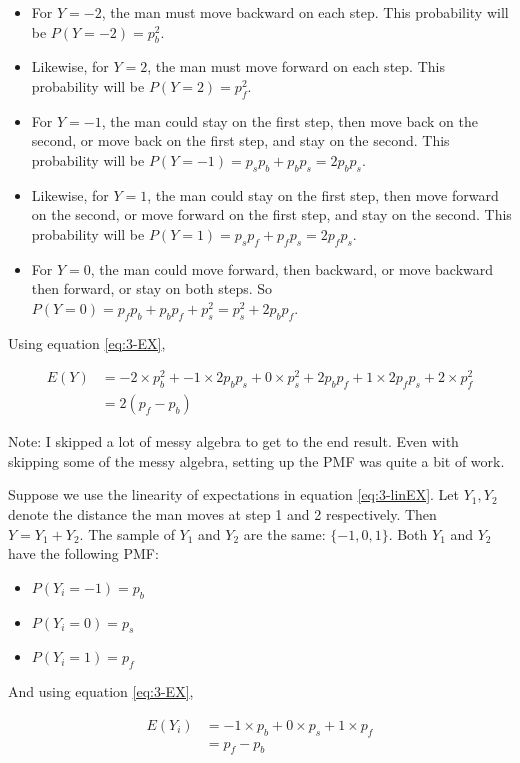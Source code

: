 \documentclass[
]{book}
\providecommand{\tightlist}{%
  \setlength{\itemsep}{0pt}\setlength{\parskip}{0pt}}
\begin{document}
\begin{itemize}
\tightlist
\item
  For \(Y=-2\), the man must move backward on each step. This probability will be \(P(Y=-2) = p_b^2\).
\item
  Likewise, for \(Y=2\), the man must move forward on each step. This probability will be \(P(Y=2) = p_f^2\).
\item
  For \(Y=-1\), the man could stay on the first step, then move back on the second, or move back on the first step, and stay on the second. This probability will be \(P(Y=-1) = p_s p_b + p_b p_s = 2p_b p_s\).
\item
  Likewise, for \(Y=1\), the man could stay on the first step, then move forward on the second, or move forward on the first step, and stay on the second. This probability will be \(P(Y=1) = p_s p_f + p_f p_s = 2p_f p_s\).
\item
  For \(Y=0\), the man could move forward, then backward, or move backward then forward, or stay on both steps. So \(P(Y=0) = p_f p_b + p_b p_f + p_s^2 = p_s^2 + 2 p_b p_f\).
\end{itemize}

Using equation \eqref{eq:3-EX},

\[
\begin{split}
E(Y) &= -2 \times p_b^2 + -1 \times 2p_b p_s + 0 \times p_s^2 + 2 p_b p_f + 1 \times 2p_f p_s + 2 \times p_f^2 \\
       &= 2 (p_f - p_b)
\end{split}
\]

Note: I skipped a lot of messy algebra to get to the end result. Even with skipping some of the messy algebra, setting up the PMF was quite a bit of work.

Suppose we use the linearity of expectations in equation \eqref{eq:3-linEX}. Let \(Y_1, Y_2\) denote the distance the man moves at step 1 and 2 respectively. Then \(Y = Y_1 + Y_2\). The sample of \(Y_1\) and \(Y_2\) are the same: \(\{-1,0,1\}\). Both \(Y_1\) and \(Y_2\) have the following PMF:

\begin{itemize}
\tightlist
\item
  \(P(Y_i = -1) = p_b\)
\item
  \(P(Y_i = 0) = p_s\)
\item
  \(P(Y_i = 1) = p_f\)
\end{itemize}

And using equation \eqref{eq:3-EX},

\[
\begin{split}
E(Y_i) &= -1 \times p_b + 0 \times p_s + 1 \times p_f \\
       &= p_f - p_b
\end{split}
\]
\end{document}
